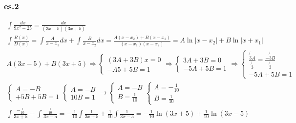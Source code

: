 \documentclass{article}
\newcommand{\abs}[1]{\lvert#1\rvert}
\begin{document}
\subsubsection{es.2}
\begin{equation*}
	\begin{matrix}
		\int\frac{dx}{9x^2-25}=\frac{dx}{(3x-5)(3x+5)}\\
		\int\frac{R(x)}{D(x)}=\int \frac{A}{x-x_1}dx+\int\frac{B}{x-x_2}dx =
		\frac{A(x-x_2)+B(x-x_1)}{(x-x_1)(x-x_2)}=
		A\ln\abs{x-x_2}+B\ln\abs{x+x_1}\\
		A(3x-5)+B(3x+5)\Rightarrow \begin{cases}
			(3A+3B)x=0\\
			-A5+5B=1
		\end{cases}\Rightarrow \begin{cases}
			3A+3B=0\\
			-5A+5B=1
		\end{cases}\Rightarrow \begin{cases}
			\frac{\not{3}A}{\not{3}}=\frac{-\not{3}B}{\not{3}}\\
			-5A+5B=1
		\end{cases}\\
		\begin{cases}
			A=-B\\
			+5B+5B=1
		\end{cases}
		\begin{cases}
			A=-B\\
			10B=1
		\end{cases}\to \begin{cases}
			A=-B\\
			B=\frac{1}{10}
		\end{cases}
		\begin{cases}
			A=-\frac{1}{10}\\
			B=\frac{1}{10}
		\end{cases}\\
		\int
		\frac{-\frac{1}{10}}{3x+5}+\int\frac{\frac{1}{10}}{3x-5}=-\frac{1}{10}\int\frac{1}{3x+5}+\frac{1}{10}\int\frac{1}{3x-5}=-\frac{1}{10}\ln(3x+5)
		+\frac{1}{10}\ln(3x-5)
	\end{matrix}
\end{equation*}
\end{document}
